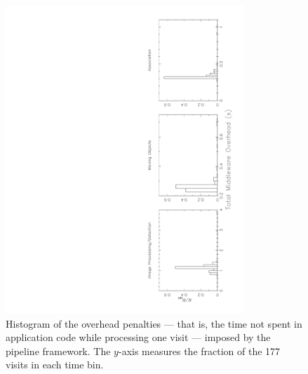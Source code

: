 \begin{figure}[htbp]
\begin{center}
\includegraphics[width=0.8\textwidth,angle=-90,scale=0.375,viewport=364 29 583 757,clip]{figures/LoopOverhead.pdf}
\caption{Histogram of the overhead penalties --- that is, the time not
  spent in application code while processing one visit --- imposed by the pipeline
  framework.  The $y$-axis measures the fraction of the 177 visits in
  each time bin.\label{f6-7}} 

\vspace{0.5\baselineskip}


\end{center}
\end{figure}
